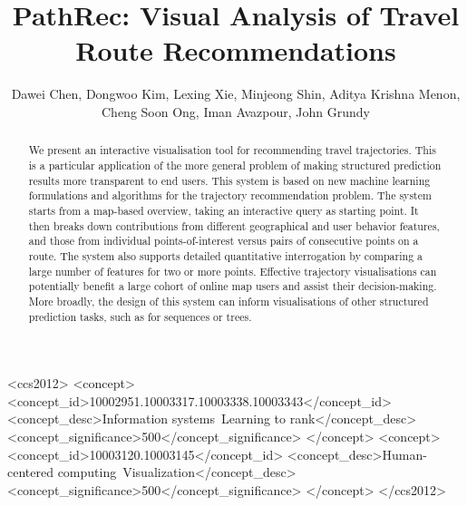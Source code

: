 \documentclass[sigconf]{acmart}
\begin{document}
\title{PathRec: Visual Analysis of Travel Route Recommendations}

\author{Dawei Chen\raisebox{.5ex}{\small*$\dagger$}, Dongwoo Kim\raisebox{.5ex}{\small*}, Lexing Xie\raisebox{.5ex}{\small*$\dagger$},  
        Minjeong Shin\raisebox{.5ex}{\small*}, Aditya Krishna Menon\raisebox{.5ex}{\small$\dagger$*}, \\
        Cheng Soon Ong\raisebox{.5ex}{\small$\dagger$*}, Iman Avazpour\raisebox{.5ex}{\small$\ddagger$}, John Grundy\raisebox{.5ex}{\small$\ddagger$}}


\renewcommand{\shortauthors}{D. Chen et al.}


\begin{abstract}
We present an interactive visualisation tool for recommending travel trajectories. 
This is a particular application of the more general problem of making structured prediction results more transparent to end users. 
This system is based on new machine learning formulations and algorithms for the trajectory recommendation problem. %
The system starts from a map-based overview, taking an interactive query as starting point.  It then breaks down contributions from different geographical and user behavior features, and those from individual points-of-interest versus pairs of consecutive points on a route. The system also supports detailed quantitative interrogation by comparing a large number of features for two or more points. 
Effective trajectory visualisations can potentially benefit a large cohort of online map users and assist their decision-making.  More broadly, the design of this system can inform visualisations of other structured prediction tasks, such as for sequences or trees. 
\end{abstract}

%
%
\begin{CCSXML}
<ccs2012>
<concept>
<concept_id>10002951.10003317.10003338.10003343</concept_id>
<concept_desc>Information systems~Learning to rank</concept_desc>
<concept_significance>500</concept_significance>
</concept>
<concept>
<concept_id>10003120.10003145</concept_id>
<concept_desc>Human-centered computing~Visualization</concept_desc>
<concept_significance>500</concept_significance>
</concept>
</ccs2012>
\end{CCSXML}
\end{document}
